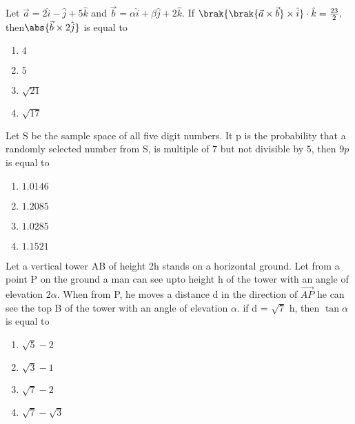 \item Let $\vec{a} = 2\hat{i}-\hat{j}+5\hat{k}$ and $ \vec{b} = \alpha \hat{i} + \beta \hat{j}+2\hat{k}.$ If $\brak{\brak{\vec{a}\times \vec{b}} \times \hat{i}}\cdot \hat{k}=\frac{23}{2},$ then$ \abs{\vec{b}\times 2\hat{j}}$ is equal to
\hfill{}
	\begin{enumerate}
    \item $4$
    \item $5$
    \item $\sqrt{21}$
    \item $\sqrt{17}$
\end{enumerate}
\item Let S be the sample space of all five digit numbers. It p is the probability that a randomly selected number from S, is multiple of $7$ but not divisible by $5$, then $9p$ is equal to
\hfill{}
	\begin{enumerate}
    \item $1.0146$
    \item $1.2085$
    \item $1.0285$
    \item $1.1521$
\end{enumerate}
\item  Let a vertical tower AB of height 2h stands on a horizontal ground. Let from a point P on the ground a man can see upto height h of the tower with an angle of elevation $2\alpha$. When from P, he moves a distance d in the direction of $ \overrightarrow{AP}$ he can see the top B of the tower with an angle of elevation $\alpha$.  if d = $\sqrt{7}$ h, then $\tan \alpha$ is equal to
\hfill{}
	\begin{enumerate}
    \item $ \sqrt{5}-2$
    \item $ \sqrt{3}-1$
    \item $ \sqrt{7}-2$
    \item $ \sqrt{7}-\sqrt{3}$
\end{enumerate}
